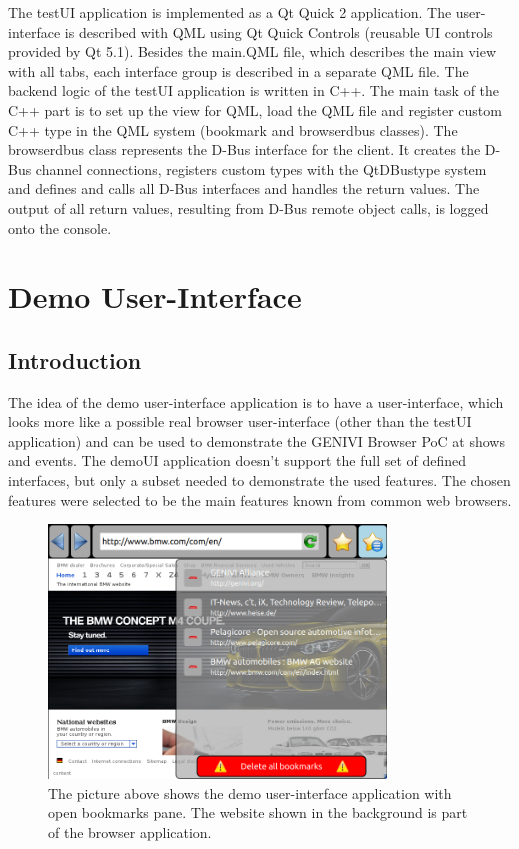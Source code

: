 \documentclass{pelagicore}
\begin{document}
The testUI application is implemented as a Qt Quick 2 application. The
user-interface is described with QML using Qt Quick Controls (reusable UI
controls provided by Qt 5.1).  Besides the main.QML file, which describes the
main view with all tabs, each interface group is described in a separate QML
file. The backend logic of the testUI application is written in C++. The main
task of the C++ part is to set up the view for QML, load the QML file and
register custom C++ type in the QML system (bookmark and browserdbus classes).
The browserdbus class represents the D-Bus interface for the client. It creates
the D-Bus channel connections, registers custom types with the QtDBustype system
and defines and calls all D-Bus interfaces and handles the return values. The
output of all return values, resulting from D-Bus remote object calls, is logged
onto the console.

\section{Demo User-Interface}
\subsection {Introduction}
The idea of the demo user-interface application is to have a user-interface,
which looks more like a possible real browser user-interface (other than the
testUI application) and can be used to demonstrate the GENIVI Browser PoC at
shows and events. The demoUI application doesn’t support the full set of
defined interfaces, but only a subset needed to demonstrate the used features.
The chosen features were selected to be the main features known from common web
browsers.

\begin{figure}[!ht]
    \center
    \includegraphics[width=0.8\textwidth]{demoui.png}
    \caption{The picture above shows the demo user-interface application with
             open bookmarks pane. The website shown in the background is part
             of the browser application.}
\end{figure}
\end{document}
